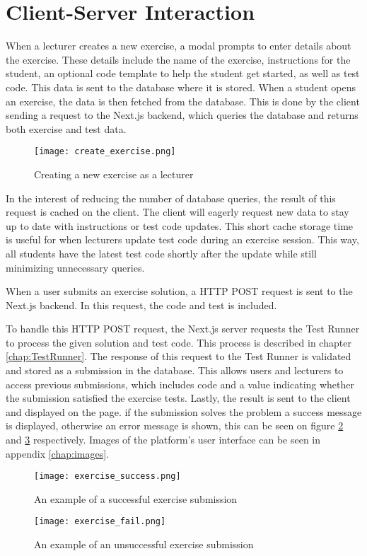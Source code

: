 \section{Client-Server Interaction}
When a lecturer creates a new exercise, a modal prompts to enter details about the exercise.
These details include the name of the exercise, instructions for the student, an optional code template to help the student get started, as well as test code.
This data is sent to the database where it is stored.
When a student opens an exercise, the data is then fetched from the database.
This is done by the client sending a request to the Next.js backend, which queries the database and returns both exercise and test data.

\begin{figure}[H]
    \centering
    \texttt{[image: create\_exercise.png]}
    \caption{Creating a new exercise as a lecturer}
    \label{fig:create_exercise}
\end{figure}

In the interest of reducing the number of database queries, the result of this request is cached on the client.
The client will eagerly request new data to stay up to date with instructions or test code updates.
This short cache storage time is useful for when lecturers update test code during an exercise session.
This way, all students have the latest test code shortly after the update while still minimizing unnecessary queries.

When a user submits an exercise solution, a HTTP POST request is sent to the Next.js backend.
In this request, the code and test is included.

To handle this HTTP POST request, the Next.js server requests the Test Runner to process the given solution and test code.
This process is described in chapter \ref{chap:TestRunner}.
The response of this request to the Test Runner is validated and stored as a submission in the database.
This allows users and lecturers to access previous submissions, which includes code and a value indicating whether the submission satisfied the exercise tests.
Lastly, the result is sent to the client and displayed on the page.
if the submission solves the problem a success message is displayed, otherwise an error message is shown, this can be seen on figure \ref{fig:exercise_success} and \ref{fig:exercise_fail} respectively.
Images of the platform's user interface can be seen in appendix \ref{chap:images}.

\begin{figure}[H]
	\texttt{[image: exercise\_success.png]}
	\centering
	\caption{An example of a successful exercise submission}
	\label{fig:exercise_success}
\end{figure}

\begin{figure}[H]
	\texttt{[image: exercise\_fail.png]}
	\centering
	\caption{An example of an unsuccessful exercise submission}
	\label{fig:exercise_fail}
\end{figure}
